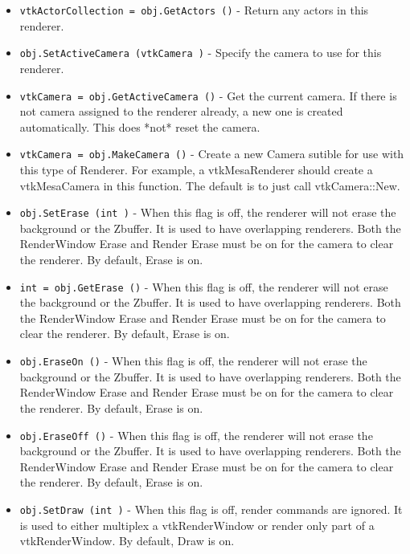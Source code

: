 \begin{itemize}
\item  \verb|vtkActorCollection = obj.GetActors ()| -  Return any actors in this renderer.

\item  \verb|obj.SetActiveCamera (vtkCamera )| -  Specify the camera to use for this renderer.

\item  \verb|vtkCamera = obj.GetActiveCamera ()| -  Get the current camera. If there is not camera assigned to the
 renderer already, a new one is created automatically.
 This does *not* reset the camera.

\item  \verb|vtkCamera = obj.MakeCamera ()| -  Create a new Camera sutible for use with this type of Renderer.
 For example, a vtkMesaRenderer should create a vtkMesaCamera
 in this function.   The default is to just call vtkCamera::New.

\item  \verb|obj.SetErase (int )| -  When this flag is off, the renderer will not erase the background
 or the Zbuffer.  It is used to have overlapping renderers.
 Both the RenderWindow Erase and Render Erase must be on
 for the camera to clear the renderer.  By default, Erase is on.

\item  \verb|int = obj.GetErase ()| -  When this flag is off, the renderer will not erase the background
 or the Zbuffer.  It is used to have overlapping renderers.
 Both the RenderWindow Erase and Render Erase must be on
 for the camera to clear the renderer.  By default, Erase is on.

\item  \verb|obj.EraseOn ()| -  When this flag is off, the renderer will not erase the background
 or the Zbuffer.  It is used to have overlapping renderers.
 Both the RenderWindow Erase and Render Erase must be on
 for the camera to clear the renderer.  By default, Erase is on.

\item  \verb|obj.EraseOff ()| -  When this flag is off, the renderer will not erase the background
 or the Zbuffer.  It is used to have overlapping renderers.
 Both the RenderWindow Erase and Render Erase must be on
 for the camera to clear the renderer.  By default, Erase is on.

\item  \verb|obj.SetDraw (int )| -  When this flag is off, render commands are ignored.  It is used to either
 multiplex a vtkRenderWindow or render only part of a vtkRenderWindow.
 By default, Draw is on.


\end{itemize}
